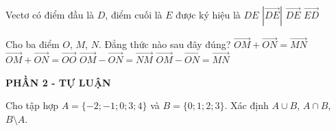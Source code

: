 \begin{ex}%
Vectơ có điểm đầu là $D$, điểm cuối là $E$  được ký hiệu là 
	\choice
	{$DE$}
	{$|\overrightarrow{DE}|$}
	{\True $\overrightarrow{DE}$}
	{$\overrightarrow{ED}$}
\end{ex}
\begin{ex}%
	Cho ba điểm $O$, $M$, $N$. Đẳng thức nào sau đây đúng?
	\choice
	{$\overrightarrow{OM}+\overrightarrow{ON}=\overrightarrow{MN}$}
	{$\overrightarrow{OM}+\overrightarrow{ON}=\overrightarrow{OO}$}
	{\True $\overrightarrow{OM}-\overrightarrow{ON}=\overrightarrow{NM}$}
	{$\overrightarrow{OM}-\overrightarrow{ON}=\overrightarrow{MN}$}
\end{ex}


\begin{center}
	\textbf{PHẦN 2 - TỰ LUẬN}
\end{center}
\begin{bt}%
Cho tập hợp $A=\{-2;-1;0;3;4\} $ và $B=\{0;1;2;3\}$. Xác định $A\cup B$, $A\cap B$, $B\setminus A$.
\end{bt}


